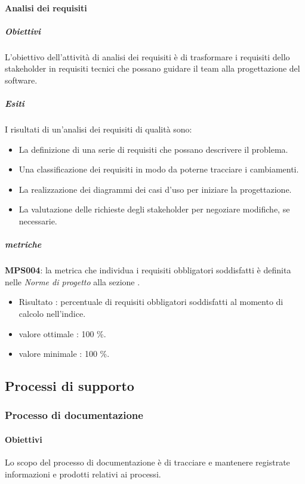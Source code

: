 \documentclass[../piano-di-qualifica.tex]{subfiles}
\begin{document}
\paragraph{Analisi dei requisiti}%
\label{par:analisi_dei_requisiti}

\subparagraph{Obiettivi}%
\label{par:obiettivi}
L'obiettivo dell'attività di analisi dei requisiti è di trasformare i requisiti dello stakeholder in requisiti tecnici che possano guidare il team alla progettazione del software.

\subparagraph{Esiti}
\label{par:esiti}
I risultati di un'analisi dei requisiti di qualità sono:
\begin{itemize}
	\item La definizione di una serie di requisiti che possano descrivere il problema.
	\item Una classificazione dei requisiti in modo da poterne tracciare i cambiamenti.
	\item La realizzazione dei diagrammi dei casi d'uso per iniziare la progettazione.
	\item La valutazione delle richieste degli stakeholder per negoziare modifiche, se necessarie.
\end{itemize}

\subparagraph{metriche}
\label{par:metriche}

\textbf{MPS004}: la metrica che individua i requisiti obbligatori soddisfatti è definita nelle \textit{Norme di progetto} alla sezione .
\begin{itemize}
	\item Risultato : percentuale di requisiti obbligatori soddisfatti al momento di calcolo nell'indice.
	\item valore ottimale : 100 \%.
	\item valore minimale : 100 \%.
\end{itemize}

\subsection{Processi di supporto}%
\label{sub:processi_di_supporto}

\subsubsection{Processo di documentazione}%
\label{subs:processo_di_documentazione}

\paragraph{Obiettivi}
\label{par:obiettivi}
Lo scopo del processo di documentazione è di tracciare e mantenere registrate informazioni e prodotti relativi ai processi.
\end{document}
